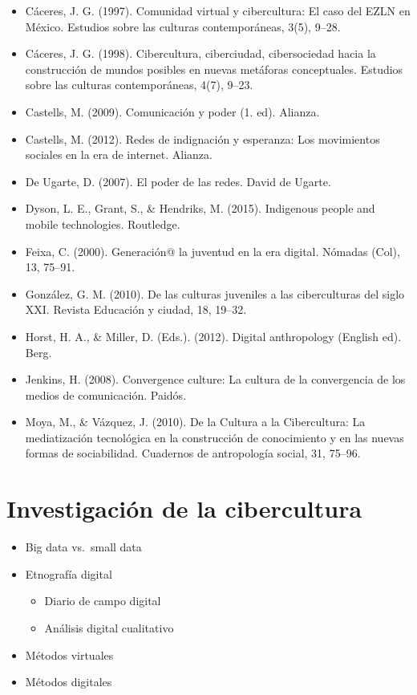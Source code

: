 \documentclass[]{book}
\providecommand{\tightlist}{%
  \setlength{\itemsep}{0pt}\setlength{\parskip}{0pt}}
\begin{document}
\begin{itemize}
\tightlist
\item
  Cáceres, J. G. (1997). Comunidad virtual y cibercultura: El caso del EZLN en México. Estudios sobre las culturas contemporáneas, 3(5), 9--28.
\item
  Cáceres, J. G. (1998). Cibercultura, ciberciudad, cibersociedad hacia la construcción de mundos posibles en nuevas metáforas conceptuales. Estudios sobre las culturas contemporáneas, 4(7), 9--23.
\item
  Castells, M. (2009). Comunicación y poder (1. ed). Alianza.
\item
  Castells, M. (2012). Redes de indignación y esperanza: Los movimientos sociales en la era de internet. Alianza.
\item
  De Ugarte, D. (2007). El poder de las redes. David de Ugarte.
\item
  Dyson, L. E., Grant, S., \& Hendriks, M. (2015). Indigenous people and mobile technologies. Routledge.
\item
  Feixa, C. (2000). Generación@ la juventud en la era digital. Nómadas (Col), 13, 75--91.
\item
  González, G. M. (2010). De las culturas juveniles a las ciberculturas del siglo XXI. Revista Educación y ciudad, 18, 19--32.
\item
  Horst, H. A., \& Miller, D. (Eds.). (2012). Digital anthropology (English ed). Berg.
\item
  Jenkins, H. (2008). Convergence culture: La cultura de la convergencia de los medios de comunicación. Paidós.
\item
  Moya, M., \& Vázquez, J. (2010). De la Cultura a la Cibercultura: La mediatización tecnológica en la construcción de conocimiento y en las nuevas formas de sociabilidad. Cuadernos de antropología social, 31, 75--96.
\end{itemize}

\hypertarget{investigaciuxf3n-de-la-cibercultura}{%
\chapter{Investigación de la cibercultura}\label{investigaciuxf3n-de-la-cibercultura}}

\begin{itemize}
\tightlist
\item
  Big data vs.~small data
\item
  Etnografía digital

  \begin{itemize}
  \tightlist
  \item
    Diario de campo digital
  \item
    Análisis digital cualitativo
  \end{itemize}
\item
  Métodos virtuales
\item
  Métodos digitales
\end{itemize}
\end{document}
